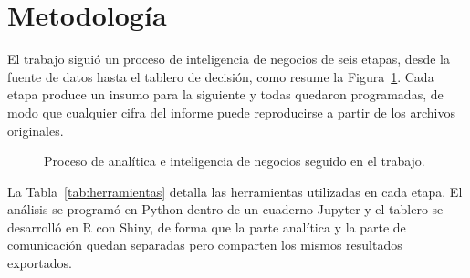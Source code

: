 \documentclass[12pt,a4paper]{article}
\begin{document}
\section{Metodología}

El trabajo siguió un proceso de inteligencia de negocios de seis etapas, desde la fuente de datos hasta el
tablero de decisión, como resume la Figura~\ref{fig:proceso}. Cada etapa produce un insumo para la siguiente y todas
quedaron programadas, de modo que cualquier cifra del informe puede reproducirse a partir de los archivos
originales.

\begin{figure}[H]\centering
{}
\caption{Proceso de analítica e inteligencia de negocios seguido en el trabajo.}\label{fig:proceso}
\end{figure}

La Tabla~\ref{tab:herramientas} detalla las herramientas utilizadas en cada etapa. El análisis se programó en
Python dentro de un cuaderno Jupyter y el tablero se desarrolló en R con Shiny, de forma que la parte analítica y la
parte de comunicación quedan separadas pero comparten los mismos resultados exportados.
\end{document}
